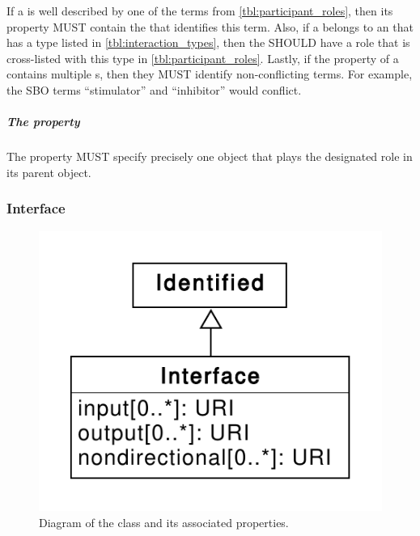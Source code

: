If a  is well described by one of the terms from \ref{tbl:participant_roles}, then its  property MUST contain the  that identifies this term.
Also, if a  belongs to an  that has a type listed in \ref{tbl:interaction_types}, then the  SHOULD have a role that is cross-listed with this type in \ref{tbl:participant_roles}.
Lastly, if the  property of a  contains multiple
 s, then they MUST identify non-conflicting terms. For example, the SBO terms ``stimulator'' and ``inhibitor'' would conflict.


\subparagraph{The  property}\label{sec:participant}

The  property MUST specify precisely one  object that plays the designated role in its parent  object.


\subsubsection{Interface}
\label{sec:Interface}

\begin{figure}[ht]
\begin{center}
\includegraphics[scale=0.6]{uml/interface}
\caption[]{Diagram of the  class and its associated properties.}
\label{uml:interface}
\end{center}
\end{figure}

